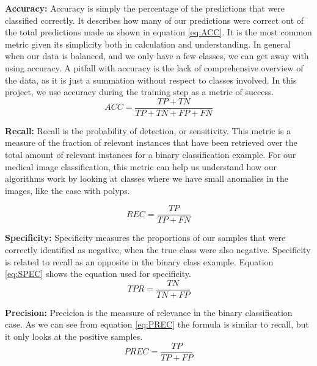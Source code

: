 \vspace{5px}
\textbf{Accuracy:}  
Accuracy is simply the percentage of the predictions that were classified correctly.
It describes how many of our predictions were correct out of the total predictions made as shown in equation \ref{eq:ACC}. It is the most common metric given its simplicity both in calculation and understanding. 
In general when our data is balanced, and we only have a few classes, we can get away with using accuracy.
A pitfall with accuracy is the lack of comprehensive overview of the data, as it is just a summation without respect to classes involved.
In this project, we use accuracy during the training step as a metric of success. 
 \begin{equation}
ACC=\frac{TP+TN}{TP+TN+FP+FN}
\label{eq:ACC}
\end{equation}

\vspace{5px}
\textbf{Recall:}  
Recall is the probability of detection, or sensitivity.
This metric is a measure of the fraction of relevant instances that have been retrieved over the total amount of relevant instances for a binary classification example.
For our medical image classification, this metric can help us understand how our algorithms work by looking at classes where we have small anomalies in the images, like the case with polyps.

\begin{equation}
REC=\frac{TP}{TP+FN}
\label{eq:REC}
\end{equation}




\vspace{5px}
\textbf{Specificity:} Specificity measures the proportions of our samples that were correctly identified as negative, when the true class were also negative. 
Specificity is related to recall as an opposite in the binary class example.
Equation \ref{eq:SPEC} shows the equation used for specificity.
\begin{equation}
TPR=\frac{TN}{TN+FP}
\label{eq:SPEC}
\end{equation}



\vspace{5px}
\textbf{Precision:}
Precicion is the meassure of relevance in the binary classification case.
As we can see from equation \ref{eq:PREC} the formula is similar to recall, but it only looks at the positive samples. 
\begin{equation}
PREC=\frac{TP}{TP+FP}
\label{eq:PREC}
\end{equation}



